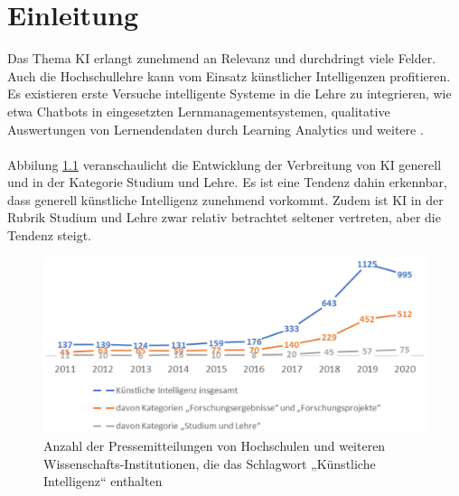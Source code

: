 \chapter{Einleitung}
Das Thema \ac{KI} erlangt zunehmend an Relevanz und durchdringt viele Felder.
Auch die Hochschullehre kann vom Einsatz künstlicher Intelligenzen profitieren.
Es existieren erste Versuche intelligente Systeme in die Lehre zu integrieren, wie etwa Chatbots in eingesetzten Lernmanagementsystemen, qualitative Auswertungen von Lernendendaten durch Learning Analytics und weitere \cite*[S. 18, S. 14ff.]{Witt.2020}.
\\ \\ \noindent
Abbilung \ref*{fig:entwickling_ki} veranschaulicht die Entwicklung der Verbreitung von \ac{KI} generell und in der Kategorie \glqq Studium und Lehre\grqq.
Es ist eine Tendenz dahin erkennbar, dass generell künstliche Intelligenz zunehmend vorkommt.
Zudem ist KI in der Rubrik Studium und Lehre zwar relativ betrachtet seltener vertreten, aber die Tendenz steigt.

\begin{figure}[hbtp]
    \centering
    \includegraphics[width=.8\textwidth]{figures/entwicklung_historie_ki.png}
    \caption{Anzahl der Pressemitteilungen von Hochschulen und weiteren Wissenschafts-Institutionen, die das Schlagwort „Künstliche Intelligenz“ enthalten \cite*[S. 9]{Wannemacher.2021}}
    \label{fig:entwickling_ki}
\end{figure}

